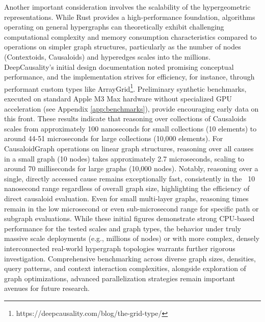 Another important consideration involves the scalability of the hypergeometric representations. While Rust provides a high-performance foundation, algorithms operating on general hypergraphs can theoretically exhibit challenging computational complexity and memory consumption characteristics compared to operations on simpler graph structures, particularly as the number of nodes (Contextoids, Causaloids) and hyperedges scales into the millions. DeepCausality’s initial design documentation noted promising conceptual performance, and the implementation strives for efficiency, for instance, through performant custom types like ArrayGrid\footnote{https://deepcausality.com/blog/the-grid-type/}. Preliminary synthetic benchmarks, executed on standard Apple M3 Max hardware without specialized GPU acceleration (see Appendix \ref{app:benchmarks}), provide encouraging early data on this front. These results indicate that reasoning over collections of Causaloids scales from approximately 100 nanoseconds for small collections (10 elements) to around 44-51 microseconds for large collections (10,000 elements). 
For CausaloidGraph operations on linear graph structures, reasoning over all causes in a small graph (10 nodes) takes approximately 2.7 microseconds, scaling to around 70 milliseconds for large graphs (10,000 nodes). Notably, reasoning over a single, directly accessed cause remains exceptionally fast, consistently in the ~10 nanosecond range regardless of overall graph size, highlighting the efficiency of direct causaloid evaluation. Even for small multi-layer graphs, reasoning times remain in the low microsecond or even sub-microsecond range for specific path or subgraph evaluations. While these initial figures demonstrate strong CPU-based performance for the tested scales and graph types, the behavior under truly massive scale deployments (e.g., millions of nodes) or with more complex, densely interconnected real-world hypergraph topologies warrants further rigorous investigation. Comprehensive benchmarking across diverse graph sizes, densities, query patterns, and context interaction complexities, alongside exploration of graph optimizations, advanced parallelization strategies  remain important avenues for future research.

